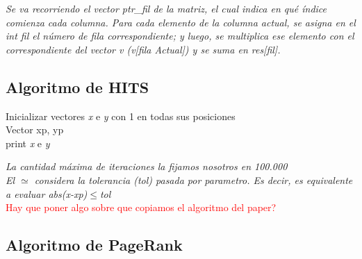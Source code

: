 \documentclass[a4paper]{article}
\begin{document}
\textit{Se va recorriendo el vector ptr_fil de la matriz, el cual indica en qu\'e \'indice comienza cada columna. Para cada elemento de la columna actual, se asigna en el int fil el n\'umero de fila correspondiente; y luego, se multiplica ese elemento con el correspondiente del vector v (v[fila Actual]) y se suma en res[fil].}\\


\newpage
\subsection{Algoritmo de HITS}

\IncMargin{1em}
\begin{algorithm}

\BlankLine

Inicializar vectores \emph{x} e \emph{y} con 1 en todas sus posiciones\\
Vector xp, yp\\
print \emph{x} e \emph{y}
\end{algorithm}\DecMargin{1em}
\textit{La cantidad m\'axima de iteraciones la fijamos nosotros en 100.000 \\
El $\simeq$ considera la tolerancia (tol) pasada por parametro. Es decir, es equivalente a evaluar abs(x-xp)$\leq$tol} \\
\textcolor{red}{Hay que poner algo sobre que copiamos el algoritmo del paper?}
\newpage
\subsection{Algoritmo de PageRank}
\end{document}
